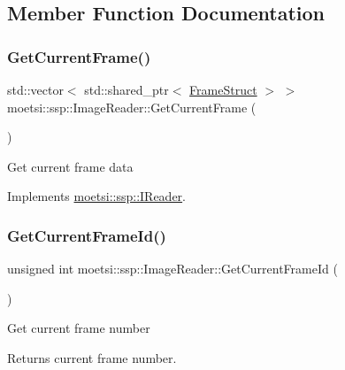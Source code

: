 \subsection{Member Function Documentation}
\mbox{\label{classmoetsi_1_1ssp_1_1ImageReader_aacdb29f83bf5e38231ef26d89338c3b1}} 
\subsubsection{\texorpdfstring{Get\+Current\+Frame()}{GetCurrentFrame()}}
{\footnotesize\ttfamily std\+::vector$<$ std\+::shared\+\_\+ptr$<$ \hyperlink{structmoetsi_1_1ssp_1_1FrameStruct}{Frame\+Struct} $>$ $>$ moetsi\+::ssp\+::\+Image\+Reader\+::\+Get\+Current\+Frame (\begin{DoxyParamCaption}{ }\end{DoxyParamCaption})\hspace{0.3cm}{\ttfamily [virtual]}}

Get current frame data 

Implements \hyperlink{classmoetsi_1_1ssp_1_1IReader_a357439182128e3911d77335c136035c0}{moetsi\+::ssp\+::\+I\+Reader}.

\mbox{\label{classmoetsi_1_1ssp_1_1ImageReader_a386125736df9f25e5c4312bb679ff031}} 
\subsubsection{\texorpdfstring{Get\+Current\+Frame\+Id()}{GetCurrentFrameId()}}
{\footnotesize\ttfamily unsigned int moetsi\+::ssp\+::\+Image\+Reader\+::\+Get\+Current\+Frame\+Id (\begin{DoxyParamCaption}{ }\end{DoxyParamCaption})\hspace{0.3cm}{\ttfamily [virtual]}}

Get current frame number \begin{DoxyReturn}{Returns}
current frame number. 
\end{DoxyReturn}


